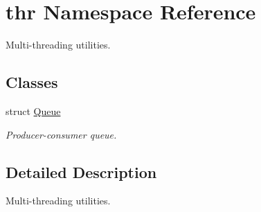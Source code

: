 \hypertarget{namespacethr}{\section{thr Namespace Reference}
\label{namespacethr}
}


Multi-\/threading utilities.  


\subsection*{Classes}
\begin{DoxyCompactItemize}
\item 
struct \hyperlink{structthr_1_1_queue}{Queue}
\begin{DoxyCompactList}\small\item\em Producer-\/consumer queue. \end{DoxyCompactList}\end{DoxyCompactItemize}


\subsection{Detailed Description}
Multi-\/threading utilities. 